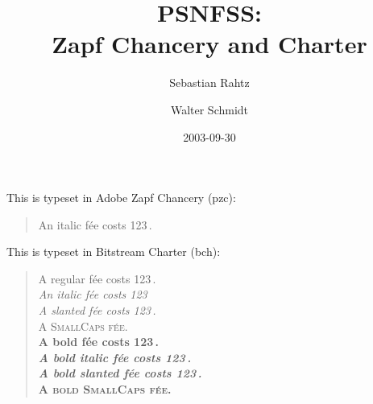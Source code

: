 \documentclass[11pt]{article}
\begin{document}
\frenchspacing
\title{PSNFSS:\\ Zapf Chancery and Charter}
\author{Sebastian Rahtz \and Walter Schmidt}
\date{2003-09-30}
\maketitle
\def\Try#1#2{%
\fontfamily{#1}\selectfont
This is typeset in #2 (#1): 
\begin{quote}
\raggedright
A regular f\'ee costs 123\,\texteuro.\\
\textit{An italic f\'ee costs 123\,\texteuro}\\
\textsl{A slanted f\'ee costs 123\,\texteuro.}\\
\textsc{A SmallCaps f\'ee.}\\
{\bfseries A bold f\'ee costs 123\,\texteuro.\\
 \textit{A bold italic f\'ee costs 123\,\texteuro.}\\
 \textsl{A bold slanted f\'ee costs 123\,\texteuro.}\\
 \textsc{A bold SmallCaps f\'ee.}\\
}
\end{quote}
\par
}

This is typeset in Adobe Zapf Chancery (pzc):
\begin{quote}
\selectfont
An italic f\'ee costs 123\,\texteuro.
\end{quote}

\Try{bch}{Bitstream Charter}
\end{document}
